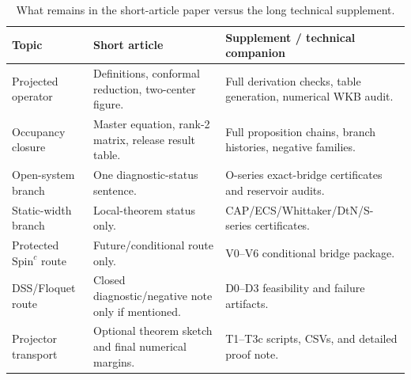 \documentclass[11pt,a4paper]{article}
\begin{document}
\begin{table}[htbp]
\centering
\caption{What remains in the short-article paper versus the long technical supplement.}
\label{tab:supplement_map}
\small
\setlength{\tabcolsep}{4pt}
\renewcommand{\arraystretch}{1.12}
\begin{tabular}{@{}l l l@{}}
\toprule
\parbox[t]{0.20\textwidth}{\raggedright \textbf{Topic}} & \parbox[t]{0.34\textwidth}{\raggedright \textbf{Short article}} & \parbox[t]{0.33\textwidth}{\raggedright \textbf{Supplement / technical companion}} \\
\midrule
\parbox[t]{0.20\textwidth}{\raggedright Projected operator} & \parbox[t]{0.34\textwidth}{\raggedright Definitions, conformal reduction, two-center figure.} & \parbox[t]{0.33\textwidth}{\raggedright Full derivation checks, table generation, numerical WKB audit.} \\
\parbox[t]{0.20\textwidth}{\raggedright Occupancy closure} & \parbox[t]{0.34\textwidth}{\raggedright Master equation, rank-2 matrix, release result table.} & \parbox[t]{0.33\textwidth}{\raggedright Full proposition chains, branch histories, negative families.} \\
\parbox[t]{0.20\textwidth}{\raggedright Open-system branch} & \parbox[t]{0.34\textwidth}{\raggedright One diagnostic-status sentence.} & \parbox[t]{0.33\textwidth}{\raggedright O-series exact-bridge certificates and reservoir audits.} \\
\parbox[t]{0.20\textwidth}{\raggedright Static-width branch} & \parbox[t]{0.34\textwidth}{\raggedright Local-theorem status only.} & \parbox[t]{0.33\textwidth}{\raggedright CAP/ECS/Whittaker/DtN/S-series certificates.} \\
\parbox[t]{0.20\textwidth}{\raggedright Protected \(\mathrm{Spin}^c\) route} & \parbox[t]{0.34\textwidth}{\raggedright Future/conditional route only.} & \parbox[t]{0.33\textwidth}{\raggedright V0--V6 conditional bridge package.} \\
\parbox[t]{0.20\textwidth}{\raggedright DSS/Floquet route} & \parbox[t]{0.34\textwidth}{\raggedright Closed diagnostic/negative note only if mentioned.} & \parbox[t]{0.33\textwidth}{\raggedright D0--D3 feasibility and failure artifacts.} \\
\parbox[t]{0.20\textwidth}{\raggedright Projector transport} & \parbox[t]{0.34\textwidth}{\raggedright Optional theorem sketch and final numerical margins.} & \parbox[t]{0.33\textwidth}{\raggedright T1--T3c scripts, CSVs, and detailed proof note.} \\
\bottomrule
\end{tabular}
\end{table}
\end{document}
